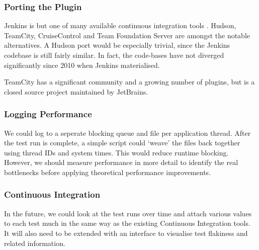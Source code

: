 \subsubsection{Porting the Plugin}

Jenkins is but one of many available continuous integration tools
\cite{ContinuousIntegrationSoftware}. Hudson, TeamCity, CruiseControl and Team
Foundation Server are amongst the notable alternatives. A Hudson port would be
especially trivial, since the Jenkins codebase is still fairly similar. In fact,
the code-bases have not diverged significantly since 2010 when Jenkins
materialised.

TeamCity \cite{TeamCity} has a significant community and a growing number of
plugins, but is a closed source project maintained by JetBrains.

\subsubsection{Logging Performance}

We could log to a seperate blocking queue and file per application thread. After
the test run is complete, a simple script could {\lq}weave{\rq} the files back
together using thread IDs and system times. This would reduce runtime blocking.
However, we should measure performance in more detail to identify the real
bottlenecks before applying theoretical performance improvements.

\subsubsection{Continuous Integration}

In the future, we could look at the test runs over time and attach various
values to each test much in the same way as the existing Continuous Integration
tools. It will also need to be extended with an interface to visualise test
flakiness and related information.
